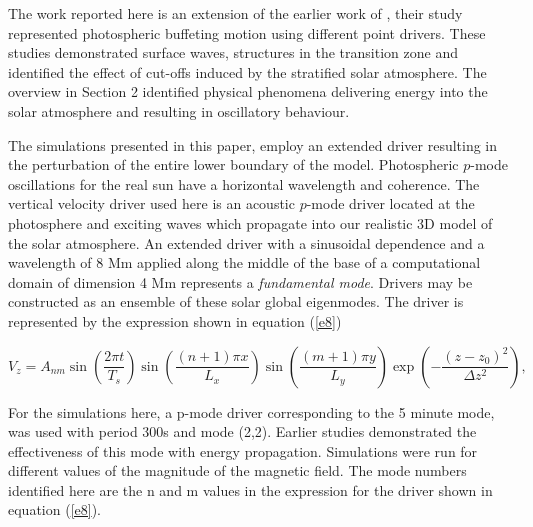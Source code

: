 \documentclass[linenumbers]{aastex63}
\begin{document}

The work reported here is an extension of the earlier work of \citet{Malins2007}, their study represented photospheric buffeting motion using different point drivers. These studies demonstrated surface waves, structures in the transition zone and identified the effect of cut-offs induced by the stratified  solar atmosphere. The overview in Section 2 identified physical phenomena delivering energy into the solar atmosphere and resulting in oscillatory behaviour. 

The simulations presented in this paper, employ an extended driver resulting in the perturbation of the entire lower boundary of the model.  Photospheric $p$-mode oscillations for the real sun have a horizontal wavelength and coherence. The vertical velocity driver used here is an acoustic $p$-mode driver located at the photosphere and exciting waves which propagate 
into our realistic 3D model of the solar atmosphere. An extended driver with a sinusoidal dependence and a wavelength of 8 Mm applied along the middle of the base of a computational domain of dimension 4 Mm represents  a {\it fundamental mode}. Drivers may be constructed as an ensemble of these solar global eigenmodes. The driver is represented by the expression shown in equation (\ref{e8}) 


\begin{equation}
 V_{z}  =  A_{nm} \sin\left(\frac{2\pi t}{T_s} \right)\sin\left(  \frac{(n+1)\pi x}{L_x} \right)  
 \sin\left(\frac{(m+1)\pi y}{L_y} \right) \exp\left( -\frac{(z-z_0)^2}{\Delta z^2} \right),
\label{e8}
\end{equation}

For the  simulations here, a p-mode driver corresponding to the 5 minute mode, was used with period 300s and mode (2,2). Earlier studies demonstrated the effectiveness of this mode with energy propagation. Simulations were run for different values of the magnitude of the magnetic field. The mode numbers identified here are the n and m values in the expression for the driver shown in equation (\ref{e8}).
\end{document}
